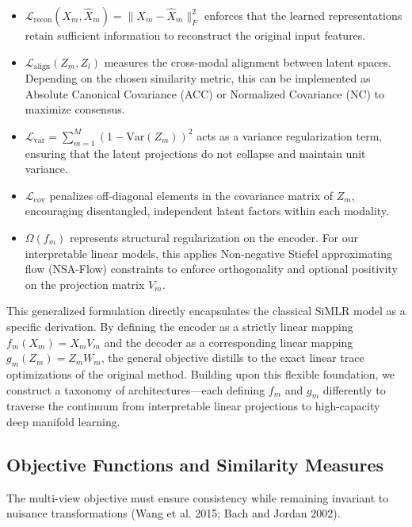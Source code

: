 \documentclass[
  letterpaper,
]{report}
\providecommand{\tightlist}{%
  \setlength{\itemsep}{0pt}\setlength{\parskip}{0pt}}
\begin{document}
\begin{itemize}
\tightlist
\item
  \(\mathcal{L}_{\text{recon}}(X_m, \hat{X}_m) = \| X_m - \hat{X}_m \|_F^2\)
  enforces that the learned representations retain sufficient
  information to reconstruct the original input features.
\item
  \(\mathcal{L}_{\text{align}}(Z_m, Z_l)\) measures the cross-modal
  alignment between latent spaces. Depending on the chosen similarity
  metric, this can be implemented as Absolute Canonical Covariance (ACC)
  or Normalized Covariance (NC) to maximize consensus.
\item
  \(\mathcal{L}_{\text{var}} = \sum_{m=1}^M (1 - \text{Var}(Z_m))^2\)
  acts as a variance regularization term, ensuring that the latent
  projections do not collapse and maintain unit variance.
\item
  \(\mathcal{L}_{\text{cov}}\) penalizes off-diagonal elements in the
  covariance matrix of \(Z_m\), encouraging disentangled, independent
  latent factors within each modality.
\item
  \(\Omega(f_m)\) represents structural regularization on the encoder.
  For our interpretable linear models, this applies Non-negative Stiefel
  approximating flow (NSA-Flow) constraints to enforce orthogonality and
  optional positivity on the projection matrix \(V_m\).
\end{itemize}

This generalized formulation directly encapsulates the classical SiMLR
model as a specific derivation. By defining the encoder as a strictly
linear mapping \(f_m(X_m) = X_m V_m\) and the decoder as a corresponding
linear mapping \(g_m(Z_m) = Z_m W_m\), the general objective distills to
the exact linear trace optimizations of the original method. Building
upon this flexible foundation, we construct a taxonomy of
architectures---each defining \(f_m\) and \(g_m\) differently to
traverse the continuum from interpretable linear projections to
high-capacity deep manifold learning.

\subsection{Objective Functions and Similarity
Measures}\label{objective-functions-and-similarity-measures}

The multi-view objective must ensure consistency while remaining
invariant to nuisance transformations (Wang et al. 2015; Bach and Jordan
2002).
\end{document}
